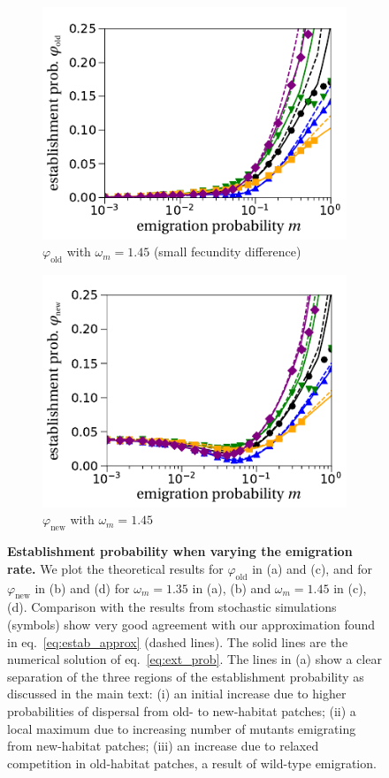 \documentclass[a4paper,11pt]{article}
\begin{document}
\begin{figure}[t!]
\begin{subfigure}{.5\textwidth}
  		\includegraphics[width=\linewidth]{fig2c.pdf}
  		\caption{$\varphi_{\text{old}}$ with $\omega_m = 1.45$ (small fecundity difference)}
	\end{subfigure}%
	\begin{subfigure}{.5\textwidth}
 		 \centering
 		 \includegraphics[width=\linewidth]{fig2d.pdf}
  		\caption{$\varphi_{\text{new}}$ with $\omega_m = 1.45$}
	\end{subfigure}
	\caption{\textbf{Establishment probability when varying the emigration rate.} \small We plot the theoretical results for $\varphi_{\text{old}}$ in (a) and (c), and for $\varphi_{\text{new}}$ in (b) and (d) for $\omega_m=1.35$ in (a), (b) and $\omega_m=1.45$ in (c), (d). Comparison with the results from stochastic simulations (symbols) show very good agreement with our approximation found in eq.~\eqref{eq:estab_approx} (dashed lines). The solid lines are the numerical solution of eq.~\eqref{eq:ext_prob}. The lines in (a) show a clear separation of the three regions of the establishment probability as discussed in the main text: {\color{change}(i) an initial increase due to higher probabilities of dispersal from old- to new-habitat patches; (ii) a local maximum due to increasing number of mutants emigrating from new-habitat patches; (iii) an increase due to relaxed competition in old-habitat patches, a result of wild-type emigration.}}

\end{figure}
\end{document}
